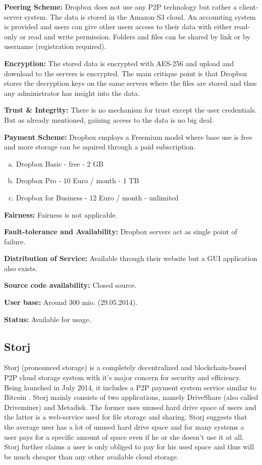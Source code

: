 \textbf{Peering Scheme:} Dropbox does not use any P2P technology but rather a client-server system. The data is stored in the Amazon S3 cloud. An accounting system is provided and users can give other users access to their data with either read-only or read and write permission. Folders and files can be shared by link or by username (registration required).

\textbf{Encryption:} The stored data is encrypted with AES-256 and upload and download to the servers is encrypted. The main critique point is that Dropbox stores the decryption keys on the same servers where the files are stored and thus any administrator has insight into the data.

\textbf{Trust \& Integrity:} There is no mechanism for trust except the user credentials. But as already mentioned, gaining access to the data is no big deal.

\textbf{Payment Scheme:} Dropbox employs a Freemium model where base use is free and more storage can be aquired through a paid subscription.
\begin{enumerate}[(a)]
	\item Dropbox Basic - free - 2 GB
	\item Dropbox Pro - 10 Euro / month - 1 TB
	\item Dropbox for Business - 12 Euro / month - unlimited
\end{enumerate}

\textbf{Fairness:} Fairness is not applicable.

\textbf{Fault-tolerance and Availability:} Dropbox servers act as single point of failure.

\textbf{Distribution of Service:} Available through their website but a GUI application also exists.

\textbf{Source code availability:} Closed source.

\textbf{User base:} Around 300 mio. (29.05.2014)\cite{dropbox:userbase}.

\textbf{Status:} Available for usage.
\subsection{Storj}
\label{subsec:storj}
Storj (pronounced storage) is a completely decentralized and blockchain-based P2P cloud storage system with it's major concern for security and efficiency. Being launched in July 2014, it includes a P2P payment system service similar to Bitcoin \cite{storj:blog:what_is_storj}. Storj mainly consists of two applications, namely DriveShare (also called Driveminer) and Metadisk. The former uses unused hard drive space of users and the latter is a web-service used for file storage and sharing. Storj suggests that the average user has a lot of unused hard drive space and for many systems a user pays for a specific amount of space even if he or she doesn't use it at all. Storj further claims a user is only obliged to pay for his used space and thus will be much cheaper than any other available cloud storage.

